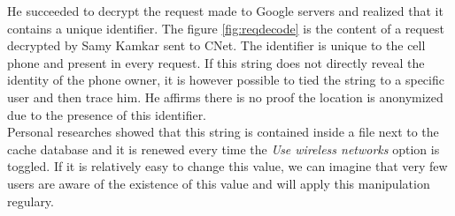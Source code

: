 He succeeded to decrypt the request made to Google servers and realized that it contains a unique identifier\cite{cnet-andr-samy}.
The figure \ref{fig:reqdecode} is the content of a request decrypted by Samy Kamkar sent to CNet.
The identifier is unique to the cell phone and present in every request.
If this string does not directly reveal the identity of the phone owner, it is however possible to tied the string to a specific user and then trace him.
He affirms there is no proof the location is anonymized due to the presence of this identifier.\\

Personal researches showed that this string is contained inside a file next to the cache database and it is renewed every time the \emph{Use wireless networks} option is toggled.
If it is relatively easy to change this value, we can imagine that very few users are aware of the existence of this value and will apply this manipulation regulary.





